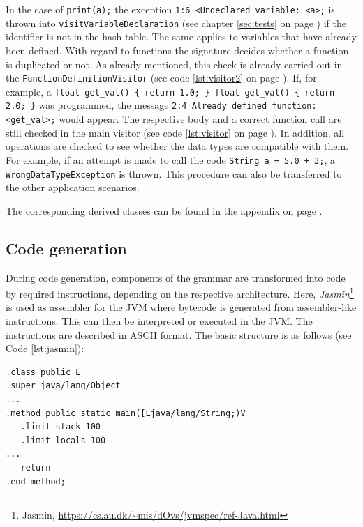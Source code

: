 In the case of \texttt{print(a);} the exception \texttt{1:6 <Undeclared variable: <a>;} is thrown into \texttt{visitVariableDeclaration} (see chapter \ref{sec:tests} on page \pageref{sec:tests}) if the identifier is not in the hash table. The same applies to variables that have already been defined. With regard to functions the signature decides whether a function is duplicated or not. As already mentioned, this check is already carried out in the \texttt{FunctionDefinitionVisitor} (see code \ref{lst:visitor2} on page \pageref{lst:visitor2}). If, for example, a \texttt{float get\_val() \{ return 1.0; \} float get\_val() \{ return 2.0; \}} was programmed, the message \texttt{2:4 Already defined function: <get\_val>;} would appear. The respective body and a correct function call are still checked in the main visitor (see code \ref{lst:visitor} on page \pageref{lst:visitor}). In addition, all operations are checked to see whether the data types are compatible with them. For example, if an attempt is made to call the code \texttt{String a = 5.0 + 3;}, a \texttt{WrongDataTypeException} is thrown. This procedure can also be transferred to the other application scenarios.

The corresponding derived classes can be found in the appendix on page \pageref{sec:exceptions}.

\subsection{Code generation}
\label{sec:code_generation}

During code generation, components of the grammar are transformed into code by required instructions, depending on the respective architecture. Here, \emph{Jasmin}\footnote{Jasmin, \url{https://cs.au.dk/~mis/dOvs/jvmspec/ref-Java.html}} is used as assembler for the JVM where bytecode is generated from assembler-like instructions. This can then be interpreted or executed in the JVM. The instructions are described in ASCII format. The basic structure is as follows (see Code \ref{lst:jasmin}):

\begin{lstlisting}[frame=htrbl, caption={Basic structure of {\ttfamily Jasmin}}, label={lst:jasmin}, basicstyle=\footnotesize]
.class public E
.super java/lang/Object
...
.method public static main([Ljava/lang/String;)V
   .limit stack 100
   .limit locals 100
...
   return
.end method;
\end{lstlisting}

